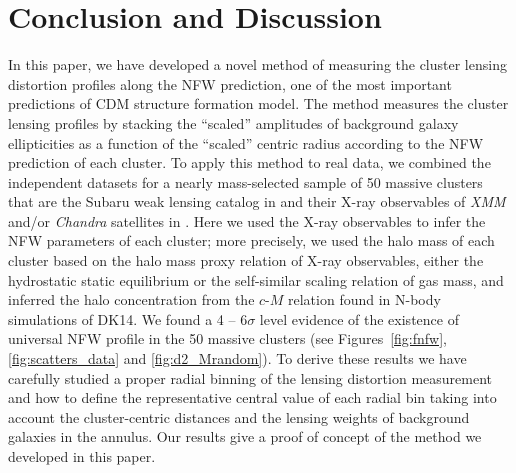 \documentclass[iop, apj]{emulateapj}
\newcommand{\?}{\stackrel{?}{=}}
\begin{document}
\section{Conclusion and Discussion}
\label{sec:conclusion}

In this paper, we have developed a novel method of measuring the cluster
lensing distortion profiles along the NFW prediction, one of the most
important predictions of CDM structure formation model. The method
measures the cluster lensing profiles by stacking the ``scaled''
amplitudes of background galaxy ellipticities as a function of the
``scaled'' centric radius according to the NFW prediction of each
cluster. To apply this method to real data, we combined the independent
datasets for a nearly mass-selected sample of 50 massive clusters that are the
Subaru weak lensing catalog in \citet{Okabeetal:13} and their X-ray
observables of {\it XMM} and/or {\it Chandra} satellites in
\citet{Martinoetal:14}. Here we used the X-ray observables to infer the
NFW parameters of each cluster; more precisely, we used the halo mass of
each cluster based on the halo mass proxy relation of X-ray observables,
either the hydrostatic static equilibrium or the self-similar scaling
relation of gas mass, and inferred the halo concentration from the
$c$-$M$ relation found in N-body simulations of DK14.
We found a 4 -- 6$\sigma$ level evidence of the existence of universal
NFW profile in the 50 massive clusters (see Figures~\ref{fig:fnfw},
\ref{fig:scatters_data} and \ref{fig:d2_Mrandom}). To derive these
results we have carefully studied a proper radial binning of the lensing
distortion measurement and how to define the representative central
value of each radial bin taking into account the cluster-centric
distances and the lensing weights of background galaxies in the annulus.
Our results give a proof of concept of the method we developed in this
paper.
\end{document}

